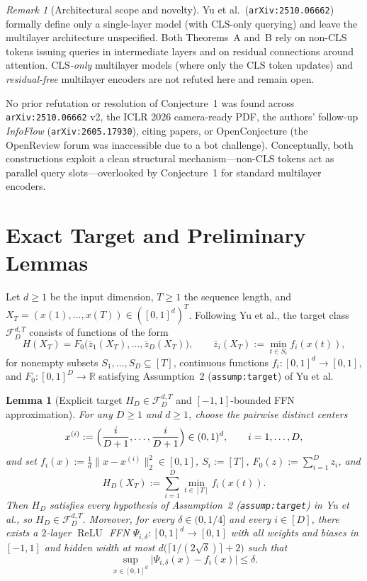 \documentclass[11pt]{article}
\theoremstyle{plain}
\newtheorem{lemma}{Lemma}
\theoremstyle{definition}
\theoremstyle{remark}
\newtheorem{remark}{Remark}
\DeclareMathOperator{\ReLU}{ReLU}
\newcommand{\R}{\mathbb{R}}
\newcommand{\1}{\mathbf{1}}
\newcommand{\CLS}{\mathrm{CLS}}
\begin{document}
\begin{remark}[Architectural scope and novelty]
Yu et al.\ (\texttt{arXiv:2510.06662}) formally define only a single-layer model (with $\CLS$-only querying) and leave the multilayer architecture unspecified. Both Theorems~A and~B rely on non-$\CLS$ tokens issuing queries in intermediate layers and on residual connections around attention. \emph{$\CLS$-only} multilayer models (where only the $\CLS$ token updates) and \emph{residual-free} multilayer encoders are not refuted here and remain open.

No prior refutation or resolution of Conjecture~1 was found across \texttt{arXiv:2510.06662} v2, the ICLR 2026 camera-ready PDF, the authors' follow-up \emph{InfoFlow} (\texttt{arXiv:2605.17930}), citing papers, or OpenConjecture (the OpenReview forum was inaccessible due to a bot challenge). Conceptually, both constructions exploit a clean structural mechanism---non-$\CLS$ tokens act as parallel query slots---overlooked by Conjecture~1 for standard multilayer encoders.
\end{remark}

\section{Exact Target and Preliminary Lemmas}

Let $d \ge 1$ be the input dimension, $T \ge 1$ the sequence length, and $X_T = (x(1), \dots, x(T)) \in ([0,1]^d)^T$. Following Yu et al., the target class $\mathcal{F}_D^{d,T}$ consists of functions of the form
\[
H(X_T) = F_0\bigl(\bar{z}_1(X_T), \dots, \bar{z}_D(X_T)\bigr), \qquad \bar{z}_i(X_T) := \min_{t \in S_i} f_i(x(t)),
\]
for nonempty subsets $S_1, \dots, S_D \subseteq [T]$, continuous functions $f_i : [0,1]^d \to [0,1]$, and $F_0 : [0,1]^D \to \R$ satisfying Assumption~2 (\texttt{assump:target}) of Yu et al.

\begin{lemma}[Explicit target $H_D \in \mathcal{F}_D^{d,T}$ and ${[-1,1]}$-bounded FFN approximation]\label{lem:target}
For any $D \ge 1$ and $d \ge 1$, choose the pairwise distinct centers
\[
x^{(i)} := \Bigl(\frac{i}{D+1}, \dots, \frac{i}{D+1}\Bigr) \in (0,1)^d, \qquad i = 1, \dots, D,
\]
and set $f_i(x) := \frac{1}{d}\|x - x^{(i)}\|_2^2 \in [0,1]$, $S_i := [T]$, $F_0(z) := \sum_{i=1}^D z_i$, and
\[
H_D(X_T) := \sum_{i=1}^D \min_{t \in [T]} f_i(x(t)).
\]
Then $H_D$ satisfies every hypothesis of Assumption~2 (\texttt{assump:target}) in Yu et al., so $H_D \in \mathcal{F}_D^{d,T}$. Moreover, for every $\delta \in (0, 1/4]$ and every $i \in [D]$, there exists a $2$-layer $\ReLU$ FFN $\Psi_{i,\delta} : [0,1]^d \to [0,1]$ with all weights and biases in $[-1,1]$ and hidden width at most $d\bigl(\lceil 1/(2\sqrt{\delta})\rceil + 2\bigr)$ such that
\[
\sup_{x \in [0,1]^d} \bigl|\Psi_{i,\delta}(x) - f_i(x)\bigr| \le \delta.
\]
\end{lemma}
\end{document}

